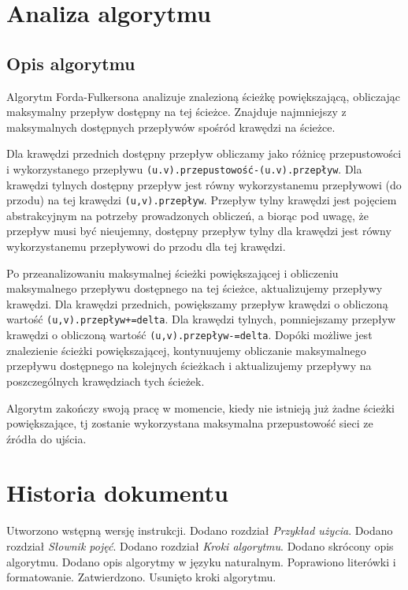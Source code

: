 \documentclass[10pt]{dokument-tiwo}
\begin{document}
\section{Analiza algorytmu}
\label{sec:analiza}

\subsection{Opis algorytmu}
Algorytm Forda-Fulkersona analizuje znalezioną ścieżkę powiększającą, obliczając
maksymalny przepływ dostępny na tej ścieżce. Znajduje najmniejszy z maksymalnych
dostępnych przepływów spośród krawędzi na ścieżce.

Dla krawędzi przednich dostępny przepływ obliczamy jako różnicę przepustowości i
wykorzystanego przepływu \texttt{(u.v).przepustowość-(u.v).przepływ}. Dla
krawędzi tylnych dostępny przepływ jest równy wykorzystanemu przepływowi (do
przodu) na tej krawędzi \texttt{(u,v).przepływ}. Przepływ tylny krawędzi jest
pojęciem abstrakcyjnym na potrzeby prowadzonych obliczeń, a biorąc pod uwagę, że
przepływ musi być nieujemny, dostępny przepływ tylny dla krawędzi jest równy
wykorzystanemu przepływowi do przodu dla tej krawędzi.

Po przeanalizowaniu maksymalnej ścieżki powiększającej i obliczeniu maksymalnego
przepływu dostępnego na tej ścieżce, aktualizujemy przepływy krawędzi. Dla
krawędzi przednich, powiększamy przepływ krawędzi o obliczoną wartość
\texttt{(u,v).przepływ+=delta}. Dla krawędzi tylnych, pomniejszamy przepływ
krawędzi o obliczoną wartość \texttt{(u,v).przepływ-=delta}. Dopóki możliwe jest
znalezienie ścieżki powiększającej, kontynuujemy obliczanie maksymalnego
przepływu dostępnego na kolejnych ścieżkach i aktualizujemy przepływy na
poszczególnych krawędziach tych ścieżek.

Algorytm zakończy swoją pracę w momencie, kiedy nie istnieją już żadne ścieżki
powiększające, tj zostanie wykorzystana maksymalna przepustowość sieci ze źródła
do ujścia.


\section{Historia dokumentu}
\begin{versions}
        Utworzono wstępną wersję instrukcji.
        Dodano rozdział \emph{Przykład użycia}.
        Dodano rozdział \emph{Słownik pojęć}.
        Dodano rozdział \emph{Kroki algorytmu}.
        Dodano skrócony opis algorytmu. Dodano opis algorytmy w języku
        naturalnym.
        Poprawiono literówki i formatowanie.
        Zatwierdzono.
        Usunięto kroki algorytmu.
\end{versions}
\end{document}
